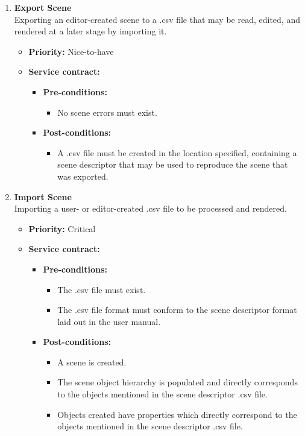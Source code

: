 \documentclass[a4paper,12pt]{article}
\begin{document}
\begin{enumerate}
			\item {\large \textbf{Export Scene}}\\
			Exporting an editor-created scene to a .csv file that may be read, edited, and rendered at a later stage by importing it.
			\begin{itemize}
				\item \textbf{Priority:} Nice-to-have
				\item \textbf{Service contract:}
				\begin{itemize}
					\item \textbf{Pre-conditions:}
						\begin{itemize}
							\item No scene errors must exist.
						\end{itemize}
					\item \textbf{Post-conditions:}
						\begin{itemize}
							\item A .csv file must be created in the location specified, containing a scene descriptor that may be used to reproduce the scene that was exported.
						\end{itemize}
				\end{itemize}
			\end{itemize}
			
			\item {\large \textbf{Import Scene}}\\
			Importing a user- or editor-created .csv file to be processed and rendered.
			\begin{itemize}
				\item \textbf{Priority:} Critical
				\item \textbf{Service contract:}
				\begin{itemize}
					\item \textbf{Pre-conditions:}
						\begin{itemize}
							\item The .csv file must exist.
							\item The .csv file format must conform to the scene descriptor format laid out in the user manual.
						\end{itemize}
					\item \textbf{Post-conditions:}
						\begin{itemize}
							\item A scene is created.
							\item The scene object hierarchy is populated and directly corresponds to the objects mentioned in the scene descriptor .csv file.
							\item Objects created have properties which directly correspond to the objects mentioned in the scene descriptor .csv file.
						\end{itemize}
				\end{itemize}
			\end{itemize}
			

\end{enumerate}
\end{document}
